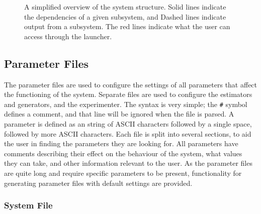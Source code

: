 \documentclass[a4paper,11pt]{article}
\begin{document}
\begin{itemize}
\begin{figure}
   \caption{A simplified overview of the system structure. Solid lines indicate
   the dependencies of a given subsystem, and Dashed lines indicate output from a
   subsystem. The red lines indicate what the user can access through the launcher.}
   \label{fig:sysstruct}
   \end{figure}
\end{itemize}
\subsection{Parameter Files}
\label{sec-3-2}

   The parameter files are used to configure the settings of all parameters that
   affect the functioning of the system. Separate files are used to configure the
   estimators and generators, and the experimenter. The syntax is very simple; the
   \texttt{\#} symbol defines a comment, and that line will be ignored when the
   file is parsed. A parameter is defined as an string of ASCII characters followed
   by a single space, followed by more ASCII characters. Each file is split into
   several sections, to aid the user in finding the parameters they are looking
   for. All parameters have comments describing their effect on the behaviour of
   the system, what values they can take, and other information relevant to the
   user. As the parameter files are quite long and require specific parameters to
   be present, functionality for generating parameter files with default settings
   are provided.
\subsubsection{System File}
\label{sec-3-2-1}
\end{document}
